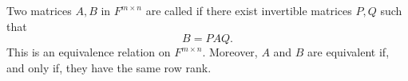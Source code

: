 Two matrices $A, B$ in $F^{m \times n}$ are called  if there exist invertible matrices $P, Q$ such that
$$
B = PAQ.
$$
This is an equivalence relation on $F^{m \times n}$. Moreover, $A$ and $B$ are equivalent if, and only if, they have the same row rank.
